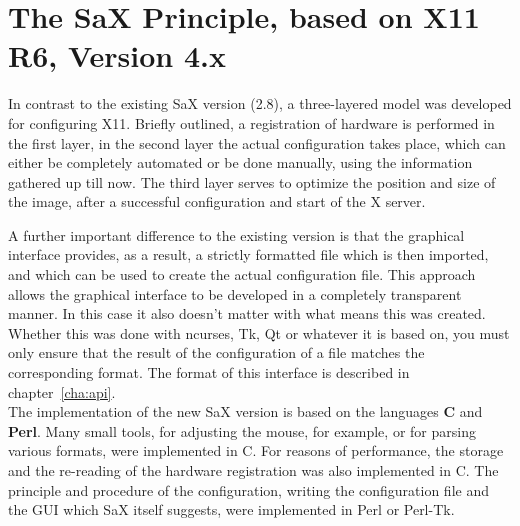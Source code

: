 \chapter{The SaX Principle, based on X11 R6, Version 4.x}
\label{cha:dsp}
\minitoc
In contrast to the existing SaX version (2.8), a three-layered model was
developed for configuring X11. Briefly outlined, a registration of
hardware is performed in the first layer, in the second layer the actual
configuration takes place, which can either be completely automated or be
done manually, using the information gathered up till now. The third layer
serves to optimize the position and size of the image, after a successful
configuration and start of the X server. 

A further important difference to the existing version is that the graphical
interface provides, as a result, a strictly formatted file which is then 
imported, and which can be used to create the actual configuration
file. This approach allows the graphical interface to be developed in a
completely transparent manner. In this case it also doesn't matter with what
means this was created. Whether this was done with ncurses, Tk, Qt or
whatever it is based on, you must only ensure that the result of the
configuration of a file matches the corresponding format. The format of this
interface is described in chapter~\ref{cha:api}.\\

The implementation of the new SaX version is based on the languages 
\textbf{C} and \textbf{Perl}. Many small tools, for adjusting the mouse, for
example, or for parsing various formats, were implemented in C. For reasons of
performance, the storage and the re-reading of the hardware registration was
also implemented in C. The principle and procedure of the configuration,
writing the configuration file and the GUI which SaX itself suggests, were
implemented in Perl or Perl-Tk.

